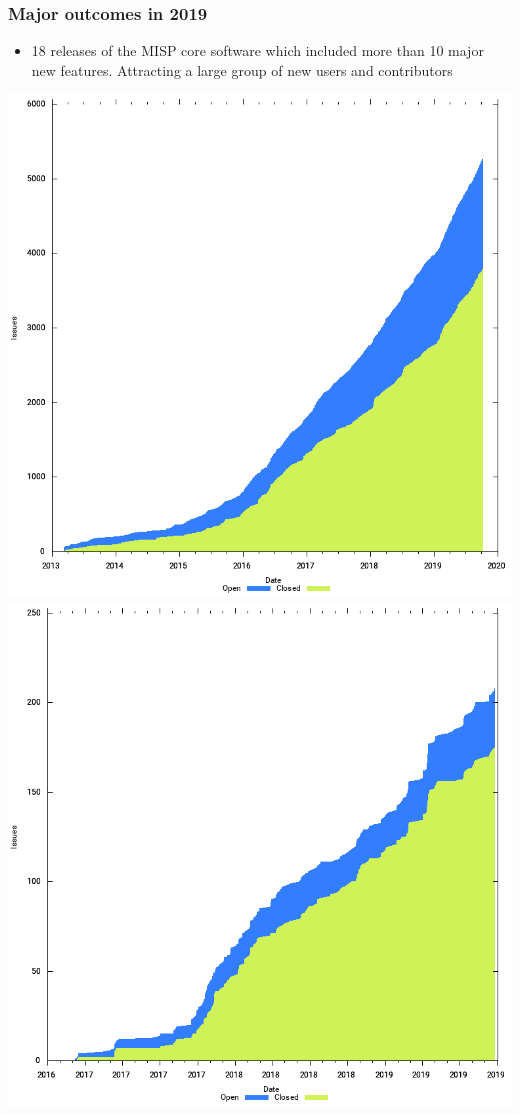 \begin{frame}
        \frametitle{Major outcomes in 2019}
\begin{itemize}
        \item 18 releases of the MISP core software which included more than 10 major new features. Attracting a large group of new users and contributors
\end{itemize}
        \includegraphics[scale=0.18]{cfd.png}
        \includegraphics[scale=0.18]{objects-cfd.png}

\end{frame}
